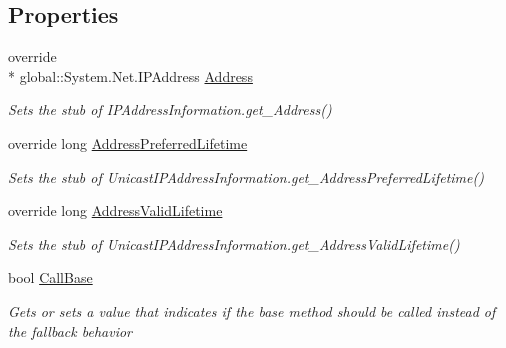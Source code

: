 \subsection*{Properties}
\begin{DoxyCompactItemize}
\item 
override \\*
global\-::\-System.\-Net.\-I\-P\-Address \hyperlink{class_system_1_1_net_1_1_network_information_1_1_fakes_1_1_stub_unicast_i_p_address_information_ad5cc85ee7220de8f38f94735a966a5c7}{Address}
\begin{DoxyCompactList}\small\item\em Sets the stub of I\-P\-Address\-Information.\-get\-\_\-\-Address()\end{DoxyCompactList}\item 
override long \hyperlink{class_system_1_1_net_1_1_network_information_1_1_fakes_1_1_stub_unicast_i_p_address_information_ada0a7b2777bacd4b77e31469c13989d6}{Address\-Preferred\-Lifetime}
\begin{DoxyCompactList}\small\item\em Sets the stub of Unicast\-I\-P\-Address\-Information.\-get\-\_\-\-Address\-Preferred\-Lifetime()\end{DoxyCompactList}\item 
override long \hyperlink{class_system_1_1_net_1_1_network_information_1_1_fakes_1_1_stub_unicast_i_p_address_information_aa04c9c905610f4b76261bb7c7144acbb}{Address\-Valid\-Lifetime}
\begin{DoxyCompactList}\small\item\em Sets the stub of Unicast\-I\-P\-Address\-Information.\-get\-\_\-\-Address\-Valid\-Lifetime()\end{DoxyCompactList}\item 
bool \hyperlink{class_system_1_1_net_1_1_network_information_1_1_fakes_1_1_stub_unicast_i_p_address_information_aa488016d334f9d8a6cd85e02aa5ffde4}{Call\-Base}
\begin{DoxyCompactList}\small\item\em Gets or sets a value that indicates if the base method should be called instead of the fallback behavior\end{DoxyCompactList}\item 

\end{DoxyCompactItemize}
